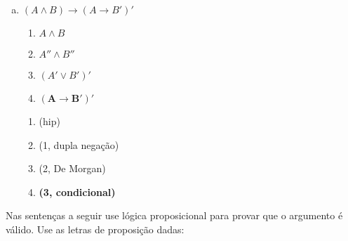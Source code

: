 \documentclass[a4paper, 12pt, addpoints]{exam}
\begin{document}
\begin{questions}
\begin{resp}
\begin{enumerate}[a)]
\begin{multicols}{2}
        \columnbreak

        \begin{enumerate}[\ding{32}]
          \item (hip)
          \item (hip da conclusão)
          \item (hip da hipótese da conclusão)
          \item (1, 3, modus ponens)
          \item \textbf{(2, 4, modus ponens)}
        \end{enumerate}

      \end{multicols}

      \item $(A \wedge B) \rightarrow (A \rightarrow B')'$ \\
      \begin{multicols}{2}

        \begin{enumerate}[1.]
          \item $A \wedge B$
          \item $A'' \wedge B''$
          \item $(A' \lor B')'$
          \item $\boldsymbol{(A \rightarrow B')'}$
        \end{enumerate}
        
        \columnbreak

        \begin{enumerate}[\ding{32}]
          \item (hip)
          \item (1, dupla negação)
          \item (2, De Morgan)
          \item \textbf{(3, condicional)}
        \end{enumerate}

      \end{multicols}

    \end{enumerate}
  \end{resp}


  \question Nas sentenças a seguir use lógica proposicional para provar que o argumento é
  válido. Use as letras de proposição dadas:


\end{questions}
\end{document}
